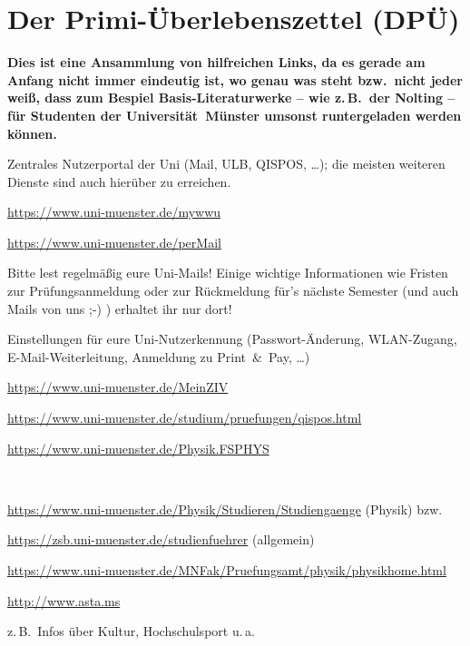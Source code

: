 \section[Primi-Überlebenszettel (DPÜ, wichtige Links)]{Der Primi-Überlebenszettel (DPÜ)\label{dpü}}
\vspace{-0.5cm}
\textbf{Dies ist eine Ansammlung von hilfreichen Links, da es gerade am Anfang nicht immer eindeutig ist, wo genau was steht bzw.\ nicht jeder weiß, dass zum Bespiel Basis-Literaturwerke -- wie z.\,B.\ der Nolting -- für Studenten der Universität~Münster umsonst runtergeladen werden können.}
\vspace{-0.2cm}
\begin{description}[itemsep=0.5cm]
\setlength{\parskip}{0cm}
\centering
\item[Uni -- myWWU-Portal:] Zentrales Nutzerportal der Uni (Mail, ULB, QISPOS, \dots); die meisten weiteren Dienste sind auch hierüber zu erreichen.

\url{https://www.uni-muenster.de/mywwu}
\item[Uni -- Mailsystem (perMail):] \url{https://www.uni-muenster.de/perMail}

Bitte lest regelmäßig eure Uni-Mails! Einige wichtige Informationen wie Fristen zur Prüfungsanmeldung oder zur Rückmeldung für's nächste Semester (und auch Mails von uns ;-) ) erhaltet ihr nur dort!
\item[Uni -- MeinZIV:] Einstellungen für eure Uni-Nutzerkennung (Passwort-Änderung, WLAN-Zugang, E-Mail-Weiterleitung, Anmeldung zu Print~\&~Pay, \dots)

\url{https://www.uni-muenster.de/MeinZIV}
\item[QISPOS:] \url{https://www.uni-muenster.de/studium/pruefungen/qispos.html}
\item[Fachschaft Physik:] \url{https://www.uni-muenster.de/Physik.FSPHYS}
\item[Studienordnungen/-infos:]~

\url{https://www.uni-muenster.de/Physik/Studieren/Studiengaenge} (Physik) bzw.\ 

\url{https://zsb.uni-muenster.de/studienfuehrer} (allgemein)
\item[Prüfungsamt Physik:] \url{https://www.uni-muenster.de/MNFak/Pruefungsamt/physik/physikhome.html}
\item[AStA Uni Münster:] \url{http://www.asta.ms}
\item[(Über-)Leben in Münster:] z.\,B.\ Infos über Kultur, Hochschulsport u.\,a.


\end{description}
